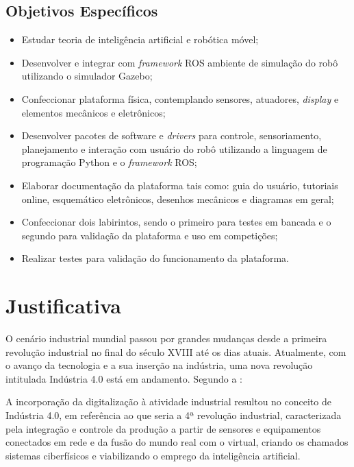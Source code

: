 \subsection{Objetivos Específicos}
\label{ssec:objesp}
\begin{itemize}
	\item Estudar teoria de inteligência artificial e robótica móvel;
	\item Desenvolver e integrar com \textit{framework} ROS ambiente de simulação do robô utilizando o simulador Gazebo;
	\item Confeccionar plataforma física, contemplando sensores, atuadores, \textit{display} e elementos mecânicos e eletrônicos;
	\item Desenvolver pacotes de software e \textit{drivers} para controle, sensoriamento, planejamento e interação com usuário do robô utilizando a linguagem de programação Python e o \textit{framework} ROS;
	\item Elaborar documentação da plataforma tais como: guia do usuário, tutoriais online, esquemático eletrônicos, desenhos mecânicos e diagramas em geral;
	\item Confeccionar dois labirintos, sendo o primeiro para testes em bancada e o segundo para validação da plataforma e uso em competições;
	\item Realizar testes para validação do funcionamento da plataforma. 
	
\end{itemize}

\section{Justificativa}
\label{sec:justificativa}
O cenário industrial mundial passou por grandes mudanças desde a primeira revolução industrial no final do século XVIII até os dias atuais. Atualmente, com o avanço da tecnologia e a sua inserção na indústria, uma nova revolução intitulada Indústria 4.0 está em andamento. Segundo a :
\begin{quoting}[rightmargin=0cm,leftmargin=4cm]
\begin{singlespace}
{\footnotesize
A incorporação da digitalização à atividade industrial resultou no conceito de Indústria 4.0, em referência ao que seria a 4ª revolução industrial, caracterizada pela integração e controle da produção a partir de sensores e equipamentos conectados em rede e da fusão do mundo real com o virtual, criando os chamados sistemas ciberfísicos e viabilizando o emprego da inteligência artificial.
}
\end{singlespace}
\end{quoting}

